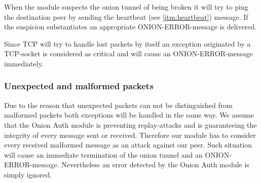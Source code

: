 \documentclass{article}
\begin{document}
When the module suspects the onion tunnel of being broken it will try to ping the destination peer
by sending the heartbeat (see \ref{itm:heartbeat}) message. If the suspicion substantiates an
appropriate ONION-ERROR-message is delivered.

Since TCP will try to handle lost packets by itself an exception originated by a TCP-socket is
considered as critical and will cause an ONION-ERROR-message immediately.

\subsubsection{Unexpected and malformed packets}
Due to the reason that unexpected packets can not be distinguished from malformed packets both
exceptions will be handled in the same way. We assume that the Onion Auth module is preventing
replay-attacks and is guaranteeing the integrity of every message sent or received. Therefore our
module has to consider every received malformed message as an attack against our peer. Such
situation will cause an immediate termination of the onion tunnel and an ONION-ERROR-message.
Nevertheless an error detected by the Onion Auth module is simply ignored.
\end{document}
